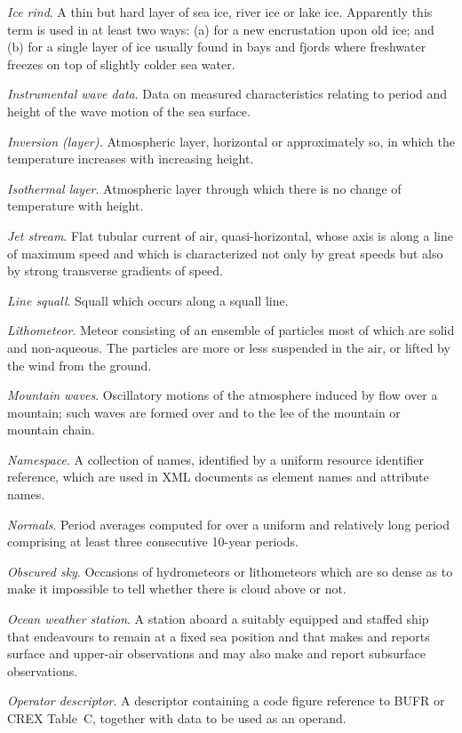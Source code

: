 \emph{Ice rind}. A thin but hard layer of sea ice, river ice or lake ice. Apparently this term is used in at least two ways: (a) for a new encrustation upon old ice; and (b) for a single layer of ice usually found in bays and fjords where freshwater freezes on top of slightly colder sea water.

\emph{Instrumental wave data}. Data on measured characteristics relating to period and height of the wave motion of the sea surface.

\emph{Inversion (layer).} Atmospheric layer, horizontal or approximately so, in which the temperature increases with increasing height.

\emph{Isothermal layer}. Atmospheric layer through which there is no change of temperature with height.

\emph{Jet stream}. Flat tubular current of air, quasi-horizontal, whose axis is along a line of maximum speed and which is characterized not only by great speeds but also by strong transverse gradients of speed.

\emph{Line squall}. Squall which occurs along a squall line.

\emph{Lithometeor}. Meteor consisting of an ensemble of particles most of which are solid and non-aqueous. The particles are more or less suspended in the air, or lifted by the wind from the ground.

\emph{Mountain waves}. Oscillatory motions of the atmosphere induced by flow over a mountain; such waves are formed over and to the lee of the mountain or mountain chain.

\emph{Namespace}. A collection of names, identified by a uniform resource identifier reference, which are used in XML documents as element names and attribute names.

\emph{Normals}. Period averages computed for over a uniform and relatively long period comprising at least three consecutive 10-year periods.

\emph{Obscured sky}. Occasions of hydrometeors or lithometeors which are so dense as to make it impossible to tell whether there is cloud above or not.

\emph{Ocean weather station}. A station aboard a suitably equipped and staffed ship that endeavours to remain at a fixed sea position and that makes and reports surface and upper-air observations and may also make and report subsurface observations.

\emph{Operator descriptor}. A descriptor containing a code figure reference to BUFR or CREX Table~C, together with data to be used as an operand.

